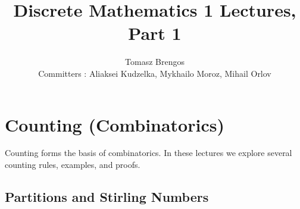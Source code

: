 

\title{Discrete Mathematics 1 Lectures, Part 1}
\author{Tomasz Brengos \\  
Committers : Aliaksei Kudzelka, Mykhailo Moroz, Mihail Orlov}
\date{}


\maketitle

\section{Counting (Combinatorics)}

Counting forms the basis of combinatorics. In these lectures we explore several counting rules, examples, and proofs.
\begingroup
  \renewcommand{\section}{\subsection}
  
\endgroup

\section{Partitions and Stirling Numbers}
\begingroup
  \renewcommand{\section}{\subsection}
  
\endgroup

